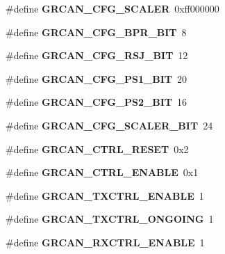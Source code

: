 \begin{DoxyCompactItemize}
\#define {\bfseries G\+R\+C\+A\+N\+\_\+\+C\+F\+G\+\_\+\+S\+C\+A\+L\+ER}~0xff000000
\item 
\mbox{\label{group__can_gadc405a957a67b0617a9ef7c90d727385}} 
\#define {\bfseries G\+R\+C\+A\+N\+\_\+\+C\+F\+G\+\_\+\+B\+P\+R\+\_\+\+B\+IT}~8
\item 
\mbox{\label{group__can_ga9609fe495baef7f24c1d47e811a8f097}} 
\#define {\bfseries G\+R\+C\+A\+N\+\_\+\+C\+F\+G\+\_\+\+R\+S\+J\+\_\+\+B\+IT}~12
\item 
\mbox{\label{group__can_gabaa1f3121d5cfbfea7eb82d2ceb4002b}} 
\#define {\bfseries G\+R\+C\+A\+N\+\_\+\+C\+F\+G\+\_\+\+P\+S1\+\_\+\+B\+IT}~20
\item 
\mbox{\label{group__can_gaf3529a4b6e8b5354b761821e5e4d84ca}} 
\#define {\bfseries G\+R\+C\+A\+N\+\_\+\+C\+F\+G\+\_\+\+P\+S2\+\_\+\+B\+IT}~16
\item 
\mbox{\label{group__can_ga1d1acd8421274fb3f7532a3e8017702f}} 
\#define {\bfseries G\+R\+C\+A\+N\+\_\+\+C\+F\+G\+\_\+\+S\+C\+A\+L\+E\+R\+\_\+\+B\+IT}~24
\item 
\mbox{\label{group__can_ga75f7987b2536858c2c2054b5b128073e}} 
\#define {\bfseries G\+R\+C\+A\+N\+\_\+\+C\+T\+R\+L\+\_\+\+R\+E\+S\+ET}~0x2
\item 
\mbox{\label{group__can_gaef10c32ccf45f0f9513aa5b0679b8cb9}} 
\#define {\bfseries G\+R\+C\+A\+N\+\_\+\+C\+T\+R\+L\+\_\+\+E\+N\+A\+B\+LE}~0x1
\item 
\mbox{\label{group__can_gab5488c9f3361750101cf86e4d691d4fe}} 
\#define {\bfseries G\+R\+C\+A\+N\+\_\+\+T\+X\+C\+T\+R\+L\+\_\+\+E\+N\+A\+B\+LE}~1
\item 
\mbox{\label{group__can_gae509323a0d03fd455fbd9c549e0b8b10}} 
\#define {\bfseries G\+R\+C\+A\+N\+\_\+\+T\+X\+C\+T\+R\+L\+\_\+\+O\+N\+G\+O\+I\+NG}~1
\item 
\mbox{\label{group__can_gac7a5468ecebdde09420ed594e8d8d09e}} 
\#define {\bfseries G\+R\+C\+A\+N\+\_\+\+R\+X\+C\+T\+R\+L\+\_\+\+E\+N\+A\+B\+LE}~1
\item 

\end{DoxyCompactItemize}
